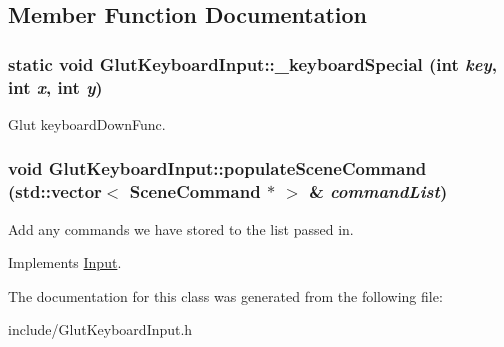 \subsection{Member Function Documentation}
\hypertarget{class_glut_keyboard_input_ad76b2ea4c7f06c3a20f3a7f950869d3d}{
\subsubsection[{\_\-keyboardSpecial}]{\setlength{\rightskip}{0pt plus 5cm}static void GlutKeyboardInput::\_\-keyboardSpecial (int {\em key}, \/  int {\em x}, \/  int {\em y})}}
\label{class_glut_keyboard_input_ad76b2ea4c7f06c3a20f3a7f950869d3d}
Glut keyboardDownFunc. \hypertarget{class_glut_keyboard_input_a820e8803532b4fa2257a44c4ece6701a}{
\subsubsection[{populateSceneCommand}]{\setlength{\rightskip}{0pt plus 5cm}void GlutKeyboardInput::populateSceneCommand (std::vector$<$ {\bf SceneCommand} $\ast$ $>$ \& {\em commandList})}}
\label{class_glut_keyboard_input_a820e8803532b4fa2257a44c4ece6701a}
Add any commands we have stored to the list passed in. 

Implements \hyperlink{class_input_ab927e3b2f1735052f6f1ef3f3bf7b29c}{Input}.

The documentation for this class was generated from the following file:\begin{DoxyCompactItemize}
\item 
include/GlutKeyboardInput.h\end{DoxyCompactItemize}
